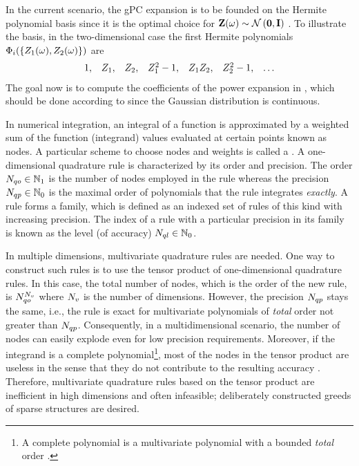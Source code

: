 In the current scenario, the gPC expansion is to be founded on the Hermite polynomial basis since it is the optimal choice for $\vZ(\o) \sim \normal{\vZero}{\mI}$ \cite{xiu2002}. To illustrate the basis, in the two-dimensional case the first Hermite polynomials $\Phi_i(\{ Z_1(\omega), Z_2(\omega) \})$ are
\[
  \begin{array}{lllllll}
  1, & Z_1, & Z_2, & Z_1^2 - 1, & Z_1 Z_2, & Z_2^2 - 1, & \dotsc
  \end{array}
\]
The goal now is to compute the coefficients of the power expansion in , which should be done according to  since the Gaussian distribution is continuous.

In numerical integration, an integral of a function is approximated by a weighted sum of the function (integrand) values evaluated at certain points known as nodes. A particular scheme to choose nodes and weights is called a . A one-dimensional quadrature rule is characterized by its order and precision. The order $N_{qo} \in \mathbb{N}_{1}$ is the number of nodes employed in the rule whereas the precision $N_{qp} \in \mathbb{N}_{0}$ is the maximal order of polynomials that the rule integrates \emph{exactly}. A rule forms a family, which is defined as an indexed set of rules of this kind with increasing precision. The index of a rule with a particular precision in its family is known as the level (of accuracy) $N_{ql} \in \mathbb{N}_{0}$.

In multiple dimensions, multivariate quadrature rules are needed. One way to construct such rules is to use the tensor product of one-dimensional quadrature rules. In this case, the total number of nodes, which is the order of the new rule, is $N_{qo}^{N_v}$ where ${N_v}$ is the number of dimensions. However, the precision $N_{qp}$ stays the same, i.e., the rule is exact for multivariate polynomials of \emph{total} order not greater than $N_{qp}$. Consequently, in a multidimensional scenario, the number of nodes can easily explode even for low precision requirements. Moreover, if the integrand is a complete polynomial\footnote{A complete polynomial is a multivariate polynomial with a bounded \emph{total} order \cite{heiss2008}.}, most of the nodes in the tensor product are useless in the sense that they do not contribute to the resulting accuracy \cite{heiss2008}. Therefore, multivariate quadrature rules based on the tensor product are inefficient in high dimensions and often infeasible; deliberately constructed greeds of sparse structures are desired.

